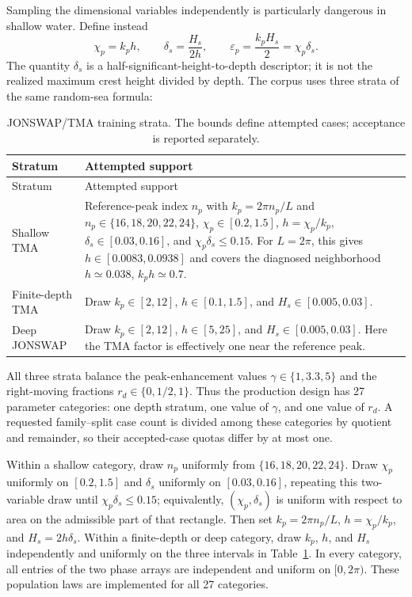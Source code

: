 \documentclass[11pt]{article}
\newcommand{\eps}{\varepsilon}
\begin{document}
Sampling the dimensional variables independently is particularly dangerous
in shallow water.  Define instead
\begin{equation}
  \chi_p=k_ph,\qquad
  \delta_s=\frac{H_s}{2h},\qquad
  \eps_p=\frac{k_pH_s}{2}=\chi_p\delta_s.
  \label{eq:sea-dimensionless-identity}
\end{equation}
The quantity $\delta_s$ is a half-significant-height-to-depth descriptor; it is not
the realized maximum crest height divided by depth.  The corpus uses
three strata of the same random-sea formula:
\begin{longtable}{>{\raggedright\arraybackslash}p{}
                  >{\raggedright\arraybackslash}p{}}
  \caption{JONSWAP/TMA training strata.  The bounds define attempted
  cases; acceptance is reported separately.}
  \label{tab:jonswap-strata}\\
  \toprule
  Stratum & Attempted support \\
  \midrule
  \endfirsthead
  \toprule
  Stratum & Attempted support \\
  \midrule
  \endhead
  Shallow TMA
    & Reference-peak index $n_p$ with $k_p=2\pi n_p/L$ and
      $n_p\in\{16,18,20,22,24\}$,
      $\chi_p\in[0.2,1.5]$, $h=\chi_p/k_p$,
      $\delta_s\in[0.03,0.16]$, and $\chi_p\delta_s\leq0.15$.
      For $L=2\pi$, this gives $h\in[0.0083,0.0938]$ and covers the
      diagnosed neighborhood $h\simeq0.038$, $k_ph\simeq0.7$. \\
  Finite-depth TMA
    & Draw $k_p\in[2,12]$, $h\in[0.1,1.5]$, and
      $H_s\in[0.005,0.03]$. \\
  Deep JONSWAP
    & Draw $k_p\in[2,12]$, $h\in[5,25]$, and
      $H_s\in[0.005,0.03]$.  Here the TMA factor is effectively one near the
      reference peak. \\
  \bottomrule
\end{longtable}
All three strata balance the peak-enhancement values
$\gamma\in\{1,3.3,5\}$ and the right-moving fractions
$r_d\in\{0,1/2,1\}$.  Thus the production design has 27 parameter categories:
one depth
stratum, one value of $\gamma$, and one value of $r_d$.  A requested
family--split case count is divided among these categories by quotient and
remainder, so their accepted-case quotas differ by at most one.

Within a shallow category, draw $n_p$ uniformly from
$\{16,18,20,22,24\}$.  Draw $\chi_p$ uniformly on $[0.2,1.5]$ and
$\delta_s$ uniformly on $[0.03,0.16]$, repeating this two-variable draw until
$\chi_p\delta_s\leq0.15$; equivalently, $(\chi_p,\delta_s)$ is uniform with
respect to area on the admissible part of that rectangle.  Then set
$k_p=2\pi n_p/L$, $h=\chi_p/k_p$, and $H_s=2h\delta_s$.  Within a
finite-depth or deep category, draw $k_p$, $h$, and $H_s$ independently and
uniformly on the three intervals in Table~\ref{tab:jonswap-strata}.  In every
category, all entries of the two phase arrays are independent and uniform on
$[0,2\pi)$.  These population laws are implemented for all 27 categories.
\end{document}
